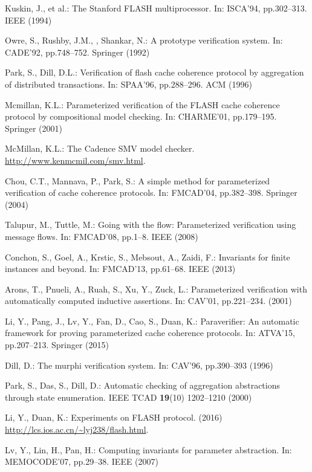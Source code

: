 \documentclass{llncs}
\begin{document}
\vspace{-3pt}
%
%

\begin{thebibliography}{50}

Kuskin, J., et al.:
\newblock The Stanford FLASH multiprocessor.
\newblock In: ISCA'94, pp.302--313. IEEE (1994)

Owre, S., Rushby, J.M., , Shankar, N.:
 {A} prototype verification system.
\newblock In: CADE'92,  pp.748--752. Springer (1992)

Park, S., Dill, D.L.:
\newblock Verification of flash cache coherence protocol by aggregation of
  distributed transactions.
\newblock In: SPAA'96, pp.288--296. ACM (1996)

Mcmillan, K.L.:
\newblock Parameterized verification of the FLASH cache coherence protocol by
  compositional model checking.
\newblock In: CHARME'01, pp.179--195. Springer (2001)

McMillan, K.L.:
\newblock The Cadence SMV model checker. \url{http://www.kenmcmil.com/smv.html}.

Chou, C.T., Mannava, P., Park, S.:
\newblock A simple method for parameterized verification of cache coherence
  protocols.
\newblock In: FMCAD'04, pp.382--398. Springer (2004)

Talupur, M., Tuttle, M.:
\newblock Going with the flow: Parameterized verification using message flows.
\newblock In: FMCAD'08, pp.1--8. IEEE (2008)

Conchon, S., Goel, A., Krstic, S., Mebsout, A., Zaidi, F.:
\newblock Invariants for finite instances and beyond.
\newblock In: FMCAD'13, pp.61--68. IEEE (2013)

Arons, T., Pnueli, A., Ruah, S., Xu, Y., Zuck, L.:
\newblock Parameterized verification with automatically computed inductive
  assertions.
\newblock In: CAV'01, pp.221--234. (2001)

Li, Y., Pang, J., Lv, Y., Fan, D., Cao, S., Duan, K.:
\newblock Paraverifier: An automatic framework for proving parameterized cache
  coherence protocols.
\newblock In: ATVA'15, pp.207--213. Springer (2015)

Dill, D.:
\newblock The murphi verification system.
\newblock In: CAV'96, pp.390--393 (1996)

Park, S., Das, S., Dill, D.:
\newblock Automatic checking of aggregation abstractions through state
  enumeration.
\newblock IEEE TCAD \textbf{19}(10) 1202--1210 (2000)

Li, Y., Duan, K.:
\newblock Experiments on FLASH protocol. (2016)
  \url{http://lcs.ios.ac.cn/~lyj238/flash.html}.

Lv, Y., Lin, H., Pan, H.:
\newblock Computing invariants for parameter abstraction.
\newblock In: MEMOCODE'07, pp.29--38. IEEE (2007)

\end{thebibliography}
\end{document}
